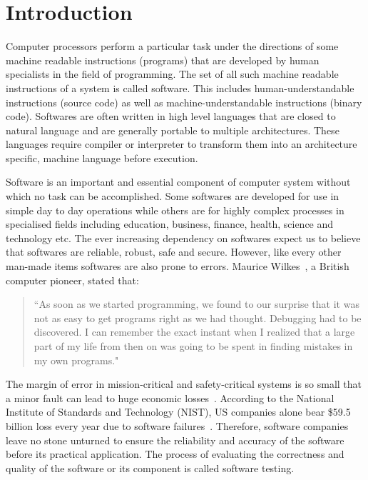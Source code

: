 \chapter{Introduction}
Computer processors perform a particular task under the directions of some machine readable instructions (programs) that are developed by human specialists in the field of programming. The set of all such machine readable instructions of a system is called software. This includes human-understandable instructions (source code) as well as machine-understandable instructions (binary code). Softwares are often written in high level languages that are closed to natural language and are generally portable to multiple architectures. These languages require compiler or interpreter to transform them into an architecture specific, machine language before execution. 

Software is an important and essential component of computer system without which no task can be accomplished. Some softwares are developed for use in simple day to day operations while others are for highly complex processes in specialised fields including education, business, finance, health, science and technology etc. The ever increasing dependency on softwares expect us to believe that softwares are reliable, robust, safe and secure. However, like every other man-made items softwares are also prone to errors. Maurice Wilkes~\cite{Maurice1985}, a British computer pioneer, stated that:
\begin{quote}
``As soon as we started programming, we found to our surprise that it was not as easy to get programs right as we had thought. Debugging had to be discovered. I can remember the exact instant when I realized that a large part of my life from then on was going to be spent in finding mistakes in my own programs."
\end{quote}
The margin of error in mission-critical and safety-critical systems is so small that a minor fault can lead to huge economic losses~\cite{huang2004securing}. According to the National Institute of Standards and Technology (NIST), US companies alone bear \$59.5 billion loss every year due to software failures~\cite{Standards2002}. Therefore, software companies leave no stone unturned to ensure the reliability and accuracy of the software before its practical application. The process of evaluating the correctness and quality of the software or its component is called software testing. 

